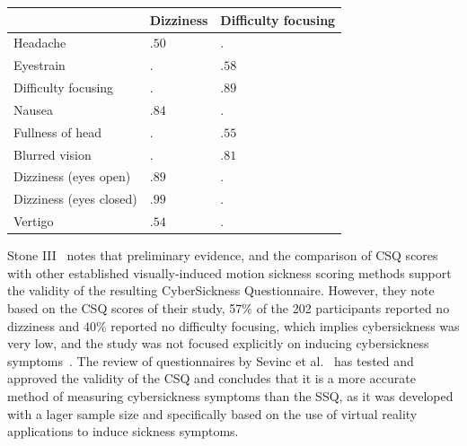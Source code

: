 \begin{center}
    \begin{tabular}{ l l l}
        \toprule
        \textbf{} & \textbf{Dizziness} & \textbf{Difficulty focusing} \\
        \midrule
        Headache                & $.50$ & $.$   \\
        Eyestrain               & $.$   & $.58$ \\
        Difficulty focusing     & $.$   & $.89$ \\
        Nausea                  & $.84$ & $.$   \\
        Fullness of head        & $.$   & $.55$ \\
        Blurred vision          & $.$   & $.81$ \\
        Dizziness (eyes open)   & $.89$ & $.$   \\
        Dizziness (eyes closed) & $.99$ & $.$   \\
        Vertigo                 & $.54$ & $.$   \\
        \bottomrule
    \end{tabular}
    \label{tab:csq-scoring}
\end{center}
Stone III~\cite{Stone2017} notes that preliminary evidence, and the comparison of CSQ scores with other established
visually-induced motion sickness scoring methods support the validity of the resulting CyberSickness Questionnaire.
However, they note based on the CSQ scores of their study, 57\% of the 202 participants reported no dizziness and 40\%
reported no difficulty focusing, which implies cybersickness was very low, and the study was not focused
explicitly on inducing cybersickness symptoms~\cite{Stone2017}.
The review of questionnaires by Sevinc et al.~\cite{Sevinc2020} has tested and approved the validity of the CSQ and
concludes that it is a more accurate method of measuring cybersickness symptoms than the SSQ, as it was developed
with a lager sample size and specifically based on the use of virtual reality applications to induce sickness symptoms.

